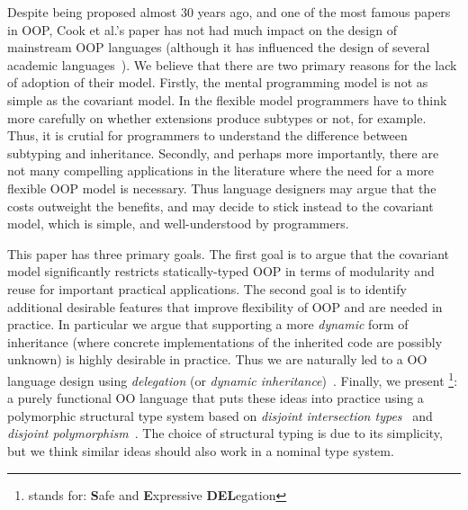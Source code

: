 \begin{comment}
\begin{itemize}

\item {\bf Inheritance and subtyping should be decoupled:} 
That is, there should be different mechanisms for class inheritance 
and class/interface subtyping. 

\item {\bf Extensions do not always produce subtypes:} 
There are cases where classes can inherit from other classes without 
producing subtypes. 

\end{itemize}

\end{comment}

Despite being proposed almost 30 years ago, and one of the most famous papers in
OOP, Cook et al.'s paper has not had much impact on the design of mainstream OOP
languages (although it has influenced the design of several academic
languages~\cite{america1991designing,graver1989type,chambers1992object,bruce1995polytoil}).
We believe that there are two primary reasons for the lack of adoption
of their model.  Firstly, the mental programming model is not
as simple as the covariant model. In the flexible model programmers have to
think more carefully on whether extensions produce subtypes or not,
for example.  Thus, it is crutial for programmers to understand the
difference between subtyping and inheritance.
Secondly, and perhaps more importantly, there are not many compelling applications in
the literature where the need for a more flexible OOP model is
necessary. Thus language designers may argue that the costs outweight 
the benefits, and may decide to stick instead to the covariant 
model, which is simple, and well-understood by programmers. 

This paper has three primary goals. The first goal is to argue that the
covariant model significantly restricts statically-typed OOP in terms of
modularity and reuse for important practical applications. The second goal is to
identify additional desirable features that improve flexibility of OOP and are
needed in practice. In particular we argue that supporting a more \emph{dynamic}
form of inheritance (where concrete implementations of the inherited code are
possibly unknown) is highly desirable in practice. Thus we are naturally led to
a OO language design using \emph{delegation} (or \emph{dynamic
  inheritance})~\cite{ungar1988self,chambers1992object}. Finally, we present
\name\footnote{\name stands for: {\bf S}afe and {\bf E}xpressive {\bf
    DEL}egation}: a purely functional OO language that puts these ideas into
practice using a polymorphic structural type system based on \emph{disjoint
  intersection types}~\cite{oliveira2016disjoint} and \emph{disjoint
  polymorphism}~\cite{alpuimdisjoint}. The choice of structural typing is due to
its simplicity, but we think similar ideas should also work in a nominal type
system.

